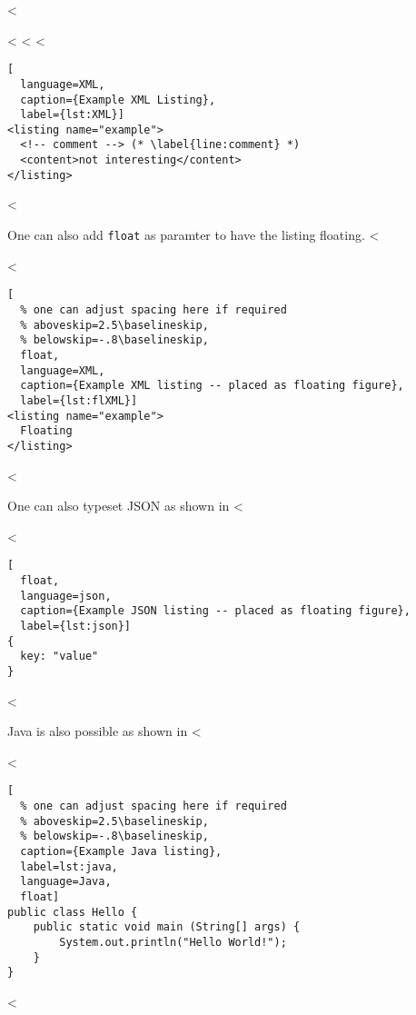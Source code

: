 <%

<%
<%
<%

\begin{lstlisting}[
  language=XML,
  caption={Example XML Listing},
  label={lst:XML}]
<listing name="example">
  <!-- comment --> (* \label{line:comment} *)
  <content>not interesting</content>
</listing>
\end{lstlisting}
<%

One can also add \verb+float+ as paramter to have the listing floating.
<%

<%
\begin{lstlisting}[
  % one can adjust spacing here if required
  % aboveskip=2.5\baselineskip,
  % belowskip=-.8\baselineskip,
  float,
  language=XML,
  caption={Example XML listing -- placed as floating figure},
  label={lst:flXML}]
<listing name="example">
  Floating
</listing>
\end{lstlisting}
<%

One can also typeset JSON as shown in <%

<%
\begin{lstlisting}[
  float,
  language=json,
  caption={Example JSON listing -- placed as floating figure},
  label={lst:json}]
{
  key: "value"
}
\end{lstlisting}
<%

Java is also possible as shown in <%

<%
\begin{lstlisting}[
  % one can adjust spacing here if required
  % aboveskip=2.5\baselineskip,
  % belowskip=-.8\baselineskip,
  caption={Example Java listing},
  label=lst:java,
  language=Java,
  float]
public class Hello {
    public static void main (String[] args) {
        System.out.println("Hello World!");
    }
}
\end{lstlisting}
<%
